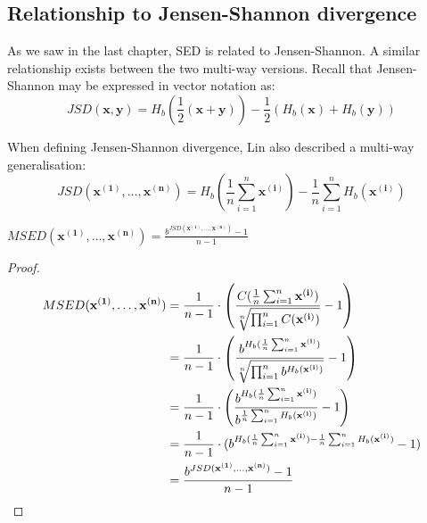 \subsection{Relationship to Jensen-Shannon divergence}
As we saw in the last chapter, SED is related to Jensen-Shannon.  A similar relationship exists between the two multi-way versions.  Recall that Jensen-Shannon may be expressed in vector notation as:
\begin{equation}
JSD(\mathbf{x}, \mathbf{y}) = H_b(\frac{1}{2} (\mathbf{x} + \mathbf{y})) - \frac{1}{2}(H_b(\mathbf{x}) + H_b(\mathbf{y}))
\end{equation}

When defining Jensen-Shannon divergence, Lin\cite{} also described a multi-way generalisation:
\begin{equation}
JSD(\mathbf{x^{(1)}},\ldots, \mathbf{x^{(n)}}) = H_b(\frac{1}{n}\sum_{i = 1}^n \mathbf{x^{(i)}}) - \frac{1}{n} \sum_{i = 1}^n H_b(\mathbf{x^{(i)}})
\end{equation}
\begin{mytheorem}{$MSED(\mathbf{x^{(1)}},\ldots, \mathbf{x^{(n)}}) = \frac{b^{JSD(\mathbf{x^{(1)}},\ldots, \mathbf{x^{(n)}})} - 1}{n - 1}$}
\begin{proof}\label{proof:JS}
\begin{align}
MSED(\mathbf{x^{(1)}},\ldots, \mathbf{x^{(n)}}) &= \frac{1}{n - 1} \cdot \left(\frac{C(\frac{1}{n}\sum_{i = 1}^n \mathbf{x^{(i)}})}{\sqrt[n]{\prod_{i=1}^n \strut C(\mathbf{x^{(i)}})}} - 1\right)\\
&= \frac{1}{n - 1} \cdot \left(\frac{b^{H_b(\frac{1}{n}\sum_{i = 1}^n \mathbf{x^{(i)}})}}{\sqrt[n]{\prod_{i=1}^n \strut b^{H_b(\mathbf{x^{(i)}})}}} - 1\right)\\
&= \frac{1}{n - 1} \cdot \left(\frac{b^{H_b(\frac{1}{n}\sum_{i = 1}^n \mathbf{x^{(i)}})}}{b^{\frac{1}{n} \sum_{i=1}^n H_b(\mathbf{x^{(i)}})}} - 1\right)\\
%
&= \frac{1}{n - 1} \cdot (b^{H_b(\frac{1}{n}\sum_{i = 1}^n \mathbf{x^{(i)}}) -\frac{1}{n}\sum_{i=1}^n H_b(\mathbf{x^{(i)}})} - 1)\\
&= \frac{b^{JSD(\mathbf{x^{(1)}},\ldots, \mathbf{x^{(n)}})} - 1}{n - 1}
\end{align}
\end{proof}
\end{mytheorem}

